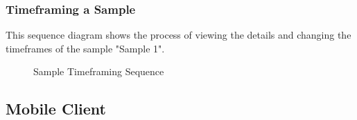 \subsubsection{Timeframing a Sample}
This sequence diagram shows the process of viewing the details and changing the timeframes of the sample "Sample 1".
\begin{figure}[!htb]
    \centering
    \caption{Sample Timeframing Sequence}
    \label{fig:seq-timeframing-a-sample}
\end{figure}

\subsection{Mobile Client}

